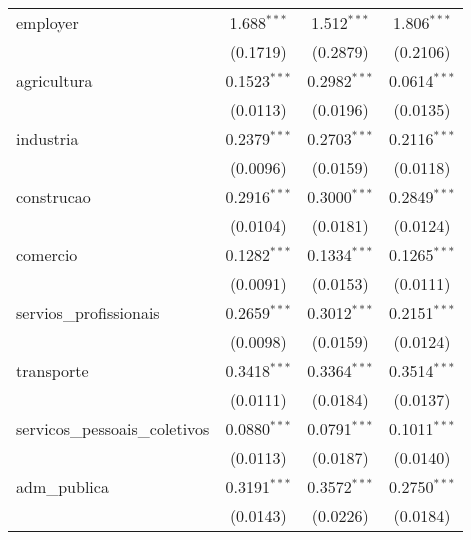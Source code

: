 \begin{tabular}{lccc}
   employer                        & 1.688$^{***}$                & 1.512$^{***}$          & 1.806$^{***}$\\   
                                   & (0.1719)                     & (0.2879)               & (0.2106)\\   
   agricultura                     & 0.1523$^{***}$               & 0.2982$^{***}$         & 0.0614$^{***}$\\   
                                   & (0.0113)                     & (0.0196)               & (0.0135)\\   
   industria                       & 0.2379$^{***}$               & 0.2703$^{***}$         & 0.2116$^{***}$\\   
                                   & (0.0096)                     & (0.0159)               & (0.0118)\\   
   construcao                      & 0.2916$^{***}$               & 0.3000$^{***}$         & 0.2849$^{***}$\\   
                                   & (0.0104)                     & (0.0181)               & (0.0124)\\   
   comercio                        & 0.1282$^{***}$               & 0.1334$^{***}$         & 0.1265$^{***}$\\   
                                   & (0.0091)                     & (0.0153)               & (0.0111)\\   
   servios\_profissionais          & 0.2659$^{***}$               & 0.3012$^{***}$         & 0.2151$^{***}$\\   
                                   & (0.0098)                     & (0.0159)               & (0.0124)\\   
   transporte                      & 0.3418$^{***}$               & 0.3364$^{***}$         & 0.3514$^{***}$\\   
                                   & (0.0111)                     & (0.0184)               & (0.0137)\\   
   servicos\_pessoais\_coletivos   & 0.0880$^{***}$               & 0.0791$^{***}$         & 0.1011$^{***}$\\   
                                   & (0.0113)                     & (0.0187)               & (0.0140)\\   
   adm\_publica                    & 0.3191$^{***}$               & 0.3572$^{***}$         & 0.2750$^{***}$\\   
                                   & (0.0143)                     & (0.0226)               & (0.0184)\\   

\end{tabular}
